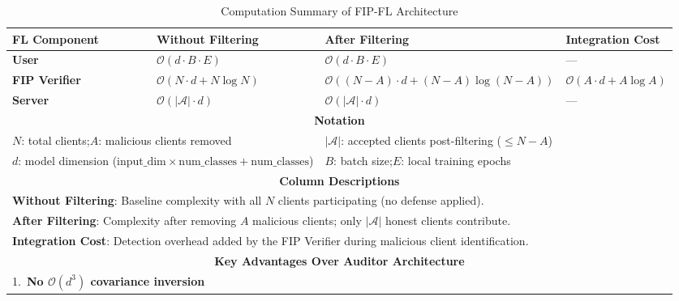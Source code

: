 \documentclass[10pt,journal,compsoc]{IEEEtran}
\begin{document}

\begin{table}[htbp]
\caption{Computation Summary of FIP-FL Architecture}
\label{tab:computation}
\centering
\renewcommand{\arraystretch}{1.4}
\begin{tabular}{|l|l|l|l|}
\hline
\textbf{FL Component} & \textbf{Without Filtering} & \textbf{After Filtering} & \textbf{Integration Cost} \\
\hline
\textbf{User}
  & $\mathcal{O}(d \cdot B \cdot E)$
  & $\mathcal{O}(d \cdot B \cdot E)$
  & --- \\
\hline
\textbf{FIP Verifier}
  & $\mathcal{O}(N{\cdot}d + N\log N)$
  & $\mathcal{O}((N{-}A){\cdot}d + (N{-}A)\log(N{-}A))$
  & $\mathcal{O}(A{\cdot}d + A\log A)$ \\
\hline
\textbf{Server}
  & $\mathcal{O}(|\mathcal{A}| \cdot d)$
  & $\mathcal{O}(|\mathcal{A}| \cdot d)$
  & --- \\
\hline
\multicolumn{4}{|c|}{\textbf{Notation}} \\
\hline
\multicolumn{2}{|l|}{$N$: total clients;\quad $A$: malicious clients removed}
  & \multicolumn{2}{l|}{$|\mathcal{A}|$: accepted clients post-filtering ($\leq N{-}A$)} \\
\hline
\multicolumn{2}{|l|}{$d$: model dimension
  ($\text{input\_dim} \times \text{num\_classes} + \text{num\_classes}$)}
  & \multicolumn{2}{l|}{$B$: batch size;\quad $E$: local training epochs} \\
\hline
\multicolumn{4}{|c|}{\textbf{Column Descriptions}} \\
\hline
\multicolumn{4}{|l|}{\textbf{Without Filtering}: Baseline complexity with all $N$
  clients participating (no defense applied).} \\
\multicolumn{4}{|l|}{\textbf{After Filtering}: Complexity after removing $A$
  malicious clients; only $|\mathcal{A}|$ honest clients contribute.} \\
\multicolumn{4}{|l|}{\textbf{Integration Cost}: Detection overhead added by the
  FIP Verifier during malicious client identification.} \\
\hline
\multicolumn{4}{|c|}{\textbf{Key Advantages Over Auditor Architecture}} \\
\hline
\multicolumn{4}{|l|}{1.~\textbf{No $\mathcal{O}(d^3)$ covariance inversion}
}
\end{tabular}
\end{table}
\end{document}
